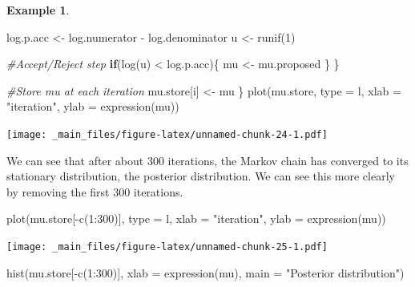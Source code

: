 \documentclass[
]{book}
\newenvironment{Shaded}{\begin{snugshade}}{\end{snugshade}}
\newcommand{\AttributeTok}[1]{\textcolor[rgb]{0.77,0.63,0.00}{#1}}
\newcommand{\CommentTok}[1]{\textcolor[rgb]{0.56,0.35,0.01}{\textit{#1}}}
\newcommand{\ControlFlowTok}[1]{\textcolor[rgb]{0.13,0.29,0.53}{\textbf{#1}}}
\newcommand{\DecValTok}[1]{\textcolor[rgb]{0.00,0.00,0.81}{#1}}
\newcommand{\FunctionTok}[1]{\textcolor[rgb]{0.00,0.00,0.00}{#1}}
\newcommand{\NormalTok}[1]{#1}
\newcommand{\OtherTok}[1]{\textcolor[rgb]{0.56,0.35,0.01}{#1}}
\newcommand{\SpecialCharTok}[1]{\textcolor[rgb]{0.00,0.00,0.00}{#1}}
\newcommand{\StringTok}[1]{\textcolor[rgb]{0.31,0.60,0.02}{#1}}
\theoremstyle{definition}
\theoremstyle{definition}
\newtheorem{example}{Example}[chapter]
\theoremstyle{definition}
\theoremstyle{definition}
\theoremstyle{remark}
\begin{document}
\begin{example}
\begin{Shaded}
\begin{Highlighting}[]
\NormalTok{    log.p.acc }\OtherTok{\textless{}{-}}\NormalTok{ log.numerator }\SpecialCharTok{{-}}\NormalTok{ log.denominator}
\NormalTok{    u }\OtherTok{\textless{}{-}} \FunctionTok{runif}\NormalTok{(}\DecValTok{1}\NormalTok{)}
    
    \CommentTok{\#Accept/Reject step}
    \ControlFlowTok{if}\NormalTok{(}\FunctionTok{log}\NormalTok{(u) }\SpecialCharTok{\textless{}}\NormalTok{ log.p.acc)\{}
\NormalTok{      mu }\OtherTok{\textless{}{-}}\NormalTok{ mu.proposed}
\NormalTok{    \}}
\NormalTok{  \}}
  
  \CommentTok{\#Store mu at each iteration}
\NormalTok{  mu.store[i] }\OtherTok{\textless{}{-}}\NormalTok{ mu}
\NormalTok{\}}
\FunctionTok{plot}\NormalTok{(mu.store, }\AttributeTok{type =} \StringTok{\textquotesingle{}l\textquotesingle{}}\NormalTok{, }\AttributeTok{xlab =} \StringTok{"iteration"}\NormalTok{, }\AttributeTok{ylab =} \FunctionTok{expression}\NormalTok{(mu))}
\end{Highlighting}
\end{Shaded}

\texttt{[image: \_main\_files/figure-latex/unnamed-chunk-24-1.pdf]}

We can see that after about 300 iterations, the Markov chain has converged to its stationary distribution, the posterior distribution. We can see this more clearly by removing the first 300 iterations.

\begin{Shaded}
\begin{Highlighting}[]
\FunctionTok{plot}\NormalTok{(mu.store[}\SpecialCharTok{{-}}\FunctionTok{c}\NormalTok{(}\DecValTok{1}\SpecialCharTok{:}\DecValTok{300}\NormalTok{)], }\AttributeTok{type =} \StringTok{\textquotesingle{}l\textquotesingle{}}\NormalTok{, }\AttributeTok{xlab =} \StringTok{"iteration"}\NormalTok{, }\AttributeTok{ylab =} \FunctionTok{expression}\NormalTok{(mu))}
\end{Highlighting}
\end{Shaded}

\texttt{[image: \_main\_files/figure-latex/unnamed-chunk-25-1.pdf]}

\begin{Shaded}
\begin{Highlighting}[]
\FunctionTok{hist}\NormalTok{(mu.store[}\SpecialCharTok{{-}}\FunctionTok{c}\NormalTok{(}\DecValTok{1}\SpecialCharTok{:}\DecValTok{300}\NormalTok{)], }\AttributeTok{xlab =} \FunctionTok{expression}\NormalTok{(mu), }\AttributeTok{main =} \StringTok{"Posterior distribution"}\NormalTok{)}
\end{Highlighting}
\end{Shaded}


\end{example}
\end{document}
